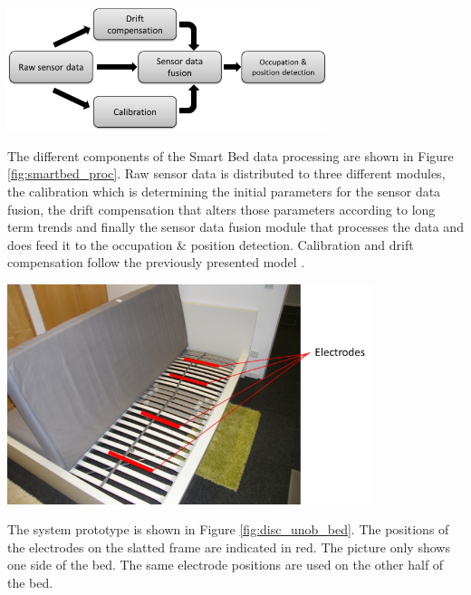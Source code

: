 \begin{minipage}{\linewidth}
\centering
\includegraphics[width=0.7\textwidth]{images/smartbed_proc}
\label{fig:smartbed_proc}
\end{minipage}

The different components of the Smart Bed data processing are shown in Figure \ref{fig:smartbed_proc}. Raw sensor data is distributed to three different modules, the calibration which is determining the initial parameters for the sensor data fusion, the drift compensation that alters those parameters according to long term trends and finally the sensor data fusion module that processes the data and does feed it to the occupation \& position detection. Calibration and drift compensation follow the previously presented model \cite{braun2012context}. 

\begin{minipage}{\linewidth}
\centering
\includegraphics[width=0.8\textwidth]{images/disc_unob_bed}
\label{fig:disc_unob_elec}
\end{minipage}

The system prototype is shown in Figure \ref{fig:disc_unob_bed}. The positions of the electrodes on the slatted frame are indicated in red. The picture only shows one side of the bed. The same electrode positions are used on the other half of the bed.

